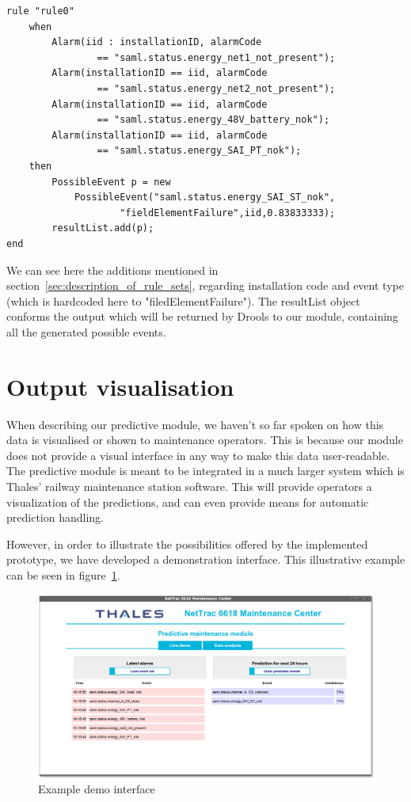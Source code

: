 \begin{framed}
\begin{lstlisting}[style=mono]
rule "rule0"
    when 
        Alarm(iid : installationID, alarmCode 
        		== "saml.status.energy_net1_not_present");
        Alarm(installationID == iid, alarmCode 
        		== "saml.status.energy_net2_not_present");
        Alarm(installationID == iid, alarmCode 
        		== "saml.status.energy_48V_battery_nok");
        Alarm(installationID == iid, alarmCode 
        		== "saml.status.energy_SAI_PT_nok");
    then 
        PossibleEvent p = new 
        	PossibleEvent("saml.status.energy_SAI_ST_nok",
        			"fieldElementFailure",iid,0.83833333);
        resultList.add(p);
end
\end{lstlisting}
\end{framed}

We can see here the additions mentioned in section~\ref{sec:description_of_rule_sets}, regarding installation code and event type (which is hardcoded here to "filedElementFailure"). The resultList object conforms the output which will be returned by Drools to our module, containing all the generated possible events.

\section{Output visualisation}
When describing our predictive module, we haven't so far spoken on how this data is visualised or shown to maintenance operators. This is because our module does not provide a visual interface in any way to make this data user-readable. The predictive module is meant to be integrated in a much larger system which is Thales' railway maintenance station software. This will provide operators a visualization of the predictions, and can even provide means for automatic prediction handling.

However, in order to illustrate the possibilities offered by the implemented prototype, we have developed a demonstration interface. This illustrative example can be seen in figure~\ref{fig:demoExample}.

\begin{figure}[hbtp]
\includegraphics[width=\textwidth]{img/demoExample.png}
\caption{Example demo interface} \label{fig:demoExample}
\end{figure}

